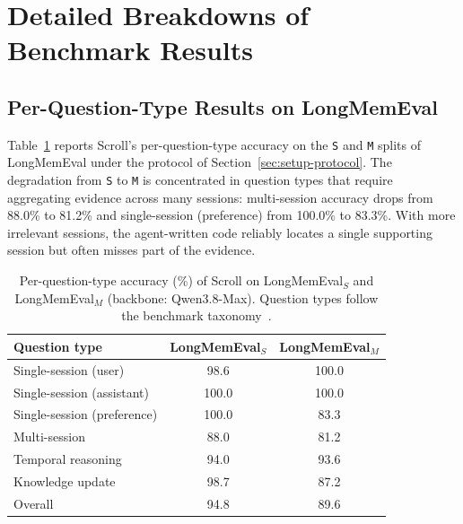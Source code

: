 \appendix
\section{Detailed Breakdowns of Benchmark Results}
\label{app:breakdown}

\subsection{Per-Question-Type Results on LongMemEval}
\label{app:lme-breakdown}

Table~\ref{tab:lme-breakdown} reports Scroll's per-question-type accuracy on
the \texttt{S} and \texttt{M} splits of LongMemEval under the protocol of
Section~\ref{sec:setup-protocol}. The degradation from \texttt{S} to \texttt{M}
is concentrated in question types that require aggregating evidence across many
sessions: multi-session accuracy drops from 88.0\% to 81.2\% and single-session
(preference) from 100.0\% to 83.3\%. With more irrelevant sessions, the
agent-written code reliably locates a single supporting session but often misses
part of the evidence.

\begin{table}[h]
  \centering
  \caption{Per-question-type accuracy (\%) of Scroll on LongMemEval$_S$ and
    LongMemEval$_M$ (backbone: Qwen3.8-Max). Question types follow the
    benchmark taxonomy~\citep{wu2025longmemeval}.}
  \label{tab:lme-breakdown}
  \small
  \begin{tabular}{lcc}
    \toprule
    Question type               & LongMemEval$_S$ & LongMemEval$_M$ \\
    \midrule
    Single-session (user)       & 98.6            & 100.0           \\
    Single-session (assistant)  & 100.0           & 100.0           \\
    Single-session (preference) & 100.0           & 83.3            \\
    Multi-session               & 88.0            & 81.2            \\
    Temporal reasoning          & 94.0            & 93.6            \\
    Knowledge update            & 98.7            & 87.2            \\
    \midrule
    Overall                     & 94.8            & 89.6            \\
    \bottomrule
  \end{tabular}
\end{table}



